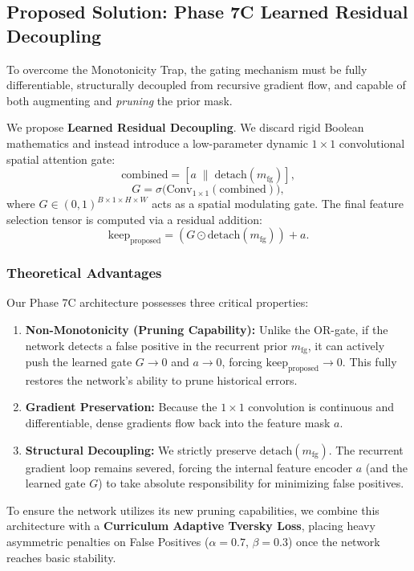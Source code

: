 \subsection{Proposed Solution: Phase 7C Learned Residual Decoupling}
To overcome the Monotonicity Trap, the gating mechanism must be fully differentiable, structurally decoupled from recursive gradient flow, and capable of both augmenting and \textit{pruning} the prior mask.

We propose \textbf{Learned Residual Decoupling}. We discard rigid Boolean mathematics and instead introduce a low-parameter dynamic $1\times 1$ convolutional spatial attention gate:
\begin{equation}
  \text{combined} = [a \;\|\; \text{detach}(m_{\text{fg}})],
\end{equation}
\begin{equation}
  G = \sigma\Big(\text{Conv}_{1 \times 1}(\text{combined})\Big),
\end{equation}
where $G \in (0, 1)^{B \times 1 \times H \times W}$ acts as a spatial modulating gate. The final feature selection tensor is computed via a residual addition:
\begin{equation}
  \label{eq:learned_residual}
  \text{keep}_{\text{proposed}} = (G \odot \text{detach}(m_{\text{fg}})) + a.
\end{equation}

\subsubsection{Theoretical Advantages}
Our Phase 7C architecture possesses three critical properties:
\begin{enumerate}
    \item \textbf{Non-Monotonicity (Pruning Capability):} Unlike the OR-gate, if the network detects a false positive in the recurrent prior $m_{\text{fg}}$, it can actively push the learned gate $G \to 0$ and $a \to 0$, forcing $\text{keep}_{\text{proposed}} \to 0$. This fully restores the network's ability to prune historical errors.
    \item \textbf{Gradient Preservation:} Because the $1 \times 1$ convolution is continuous and differentiable, dense gradients flow back into the feature mask $a$.
    \item \textbf{Structural Decoupling:} We strictly preserve $\text{detach}(m_{\text{fg}})$. The recurrent gradient loop remains severed, forcing the internal feature encoder $a$ (and the learned gate $G$) to take absolute responsibility for minimizing false positives.
\end{enumerate}

To ensure the network utilizes its new pruning capabilities, we combine this architecture with a \textbf{Curriculum Adaptive Tversky Loss}, placing heavy asymmetric penalties on False Positives ($\alpha=0.7$, $\beta=0.3$) once the network reaches basic stability.
